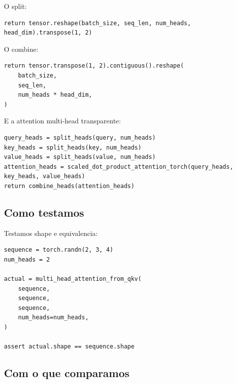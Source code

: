 O split:



\begin{Verbatim}[fontsize=\small,breaklines=true,label=python]
return tensor.reshape(batch_size, seq_len, num_heads, head_dim).transpose(1, 2)
\end{Verbatim}



O combine:



\begin{Verbatim}[fontsize=\small,breaklines=true,label=python]
return tensor.transpose(1, 2).contiguous().reshape(
    batch_size,
    seq_len,
    num_heads * head_dim,
)
\end{Verbatim}



E a attention multi-head transparente:



\begin{Verbatim}[fontsize=\small,breaklines=true,label=python]
query_heads = split_heads(query, num_heads)
key_heads = split_heads(key, num_heads)
value_heads = split_heads(value, num_heads)
attention_heads = scaled_dot_product_attention_torch(query_heads, key_heads, value_heads)
return combine_heads(attention_heads)
\end{Verbatim}



\subsection{Como testamos}



Testamos shape e equivalencia:



\begin{Verbatim}[fontsize=\small,breaklines=true,label=python]
sequence = torch.randn(2, 3, 4)
num_heads = 2

actual = multi_head_attention_from_qkv(
    sequence,
    sequence,
    sequence,
    num_heads=num_heads,
)

assert actual.shape == sequence.shape
\end{Verbatim}



\subsection{Com o que comparamos}




